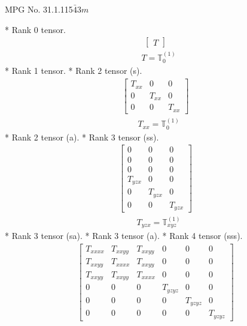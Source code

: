 \documentclass[fleqn,8pt,landscape]{jsarticle}
\begin{document}
\setcounter{MaxMatrixCols}{32}

\renewcommand{\tablename}{Table~}
\renewcommand{\figurename}{Figure~}
\begin{center}
\LARGE
MPG No. 31.1.115\quad$\bar{4}3m$
\end{center}
* Rank 0 tensor.
\begin{align*}
\begin{bmatrix} T \end{bmatrix}
\end{align*}
\begin{align*}
& T = \mathbb{T}_{0}^{(1)}
\end{align*}
* Rank 1 tensor.
* Rank 2 tensor (s).
\begin{align*}
\begin{bmatrix} T_{xx} & 0 & 0 \\ 0 & T_{xx} & 0 \\ 0 & 0 & T_{xx} \end{bmatrix}
\end{align*}
\begin{align*}
& T_{xx} = \mathbb{T}_{0}^{(1)}
\end{align*}
* Rank 2 tensor (a).
* Rank 3 tensor (ss).
\begin{align*}
\begin{bmatrix} 0 & 0 & 0 \\ 0 & 0 & 0 \\ 0 & 0 & 0 \\ T_{yzx} & 0 & 0 \\ 0 & T_{yzx} & 0 \\ 0 & 0 & T_{yzx} \end{bmatrix}
\end{align*}
\begin{align*}
& T_{yzx} = \mathbb{T}_{xyz}^{(1)}
\end{align*}
* Rank 3 tensor (sa).
* Rank 3 tensor (a).
* Rank 4 tensor (sss).
\begin{align*}
\begin{bmatrix} T_{xxxx} & T_{xxyy} & T_{xxyy} & 0 & 0 & 0 \\ T_{xxyy} & T_{xxxx} & T_{xxyy} & 0 & 0 & 0 \\ T_{xxyy} & T_{xxyy} & T_{xxxx} & 0 & 0 & 0 \\ 0 & 0 & 0 & T_{yzyz} & 0 & 0 \\ 0 & 0 & 0 & 0 & T_{yzyz} & 0 \\ 0 & 0 & 0 & 0 & 0 & T_{yzyz} \end{bmatrix}
\end{align*}
\end{document}
